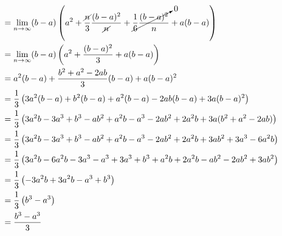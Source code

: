 \documentclass[letterpaper]{article}
\begin{document}
\[\begin{aligned}
   &= \lim_{n\to \infty} (b-a) \left( a^2 + \frac{\cancel{n}}{3}\frac{(b-a)^2}{\cancel{n}} + \cancelto{0}{\frac{1}{6}\frac{(b-a)^2}{n}} + a(b-a) \right)  \\
   &= \lim_{n\to \infty} (b-a) \left( a^2 + \frac{(b-a)^2}{3} + a(b-a) \right)  \\
   &= a^2(b-a) + \frac{b^2+a^2-2ab}{3}(b-a) + a(b-a)^2 \\
   &= \frac{1}{3}\left( 3a^2(b-a) + b^2(b-a)+a^2(b-a)-2ab(b-a) + 3a(b-a)^2\right) \\
   &= \frac{1}{3}\left( 3a^2b -3a^3 + b^3 - ab^2 + a^2b - a^3 - 2ab^2 + 2a^2b + 3a(b^2+a^2-2ab)\right) \\
   &= \frac{1}{3}\left( 3a^2b -3a^3 + b^3 - ab^2 + a^2b - a^3 - 2ab^2 + 2a^2b + 3ab^2+3a^3-6a^2b\right) \\
   &= \frac{1}{3}\left( 3a^2b-6a^2b -3a^3- a^3+ 3a^3 + b^3 + a^2b+ 2a^2b - ab^2 - 2ab^2  + 3ab^2 \right) \\
   &= \frac{1}{3}\left( -3a^2b + 3a^2b - a^3 + b^3 \right) \\
   &= \frac{1}{3}\left(b^3 - a^3 \right) \\
   &= \frac{b^3 - a^3 }{3} \\
   \end{aligned}\]
\end{document}

